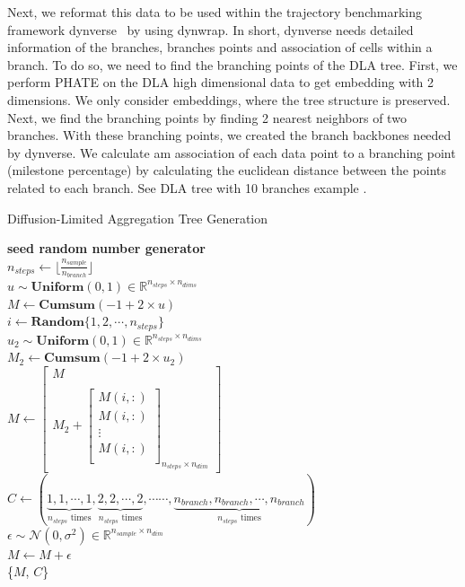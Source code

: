 Next, we reformat this data to be used within the trajectory benchmarking framework dynverse~\citep{saelens2019comparison} by using dynwrap. In short, dynverse needs detailed information of the branches, branches points and association of cells within a branch.  To do so, we need to find the branching points of the DLA tree. First, we perform PHATE on the DLA high dimensional data to get embedding with 2 dimensions. We only consider embeddings, where the tree structure is preserved. Next, we find the branching points by finding 2 nearest neighbors of two branches. With these branching points, we created the branch backbones needed by dynverse. We calculate am association of each data point to a branching point (milestone percentage) by calculating the euclidean distance between the points related to each branch. See DLA tree with 10 branches example .
\begin{algorithm}
\caption{Diffusion-Limited Aggregation Tree Generation}
\label{alg:DLA}
    \textbf{seed random number generator}\\
    $n_{steps} \gets \lfloor\frac{n_{sample}}{n_{branch}}\rfloor$\\
    $u \sim \textbf{Uniform}(0,1)\in\mathbb{R}^{n_{steps} \times n_{dims}}$\\
    $M \gets \textbf{Cumsum}(-1 + 2 \times u)$\\
    {
         $i \gets \textbf{Random}\{1,2,\cdots, n_{steps}\}$\\
         $u_2 \sim \textbf{Uniform}(0,1)\in\mathbb{R}^{n_{steps} \times n_{dims}}$\\
         $M_2 \gets \textbf{Cumsum}(-1 + 2 \times u_2)$\\
        $M \gets \begin{bmatrix}M \\\\
            M_2 +\left[\begin{array}{c} 
                M(i, :)\\
                M(i, :)\\
                \vdots\\
                M(i, :)\\
        \end{array}\right]_{n_{steps}\times n_{dim}} \end{bmatrix}$\\
    }
    $C \gets (\underbrace{1,1,\cdots, 1}_{n_{steps} \text{ times}}, \underbrace{2,2,\cdots, 2}_{n_{steps} \text{ times}},  \cdots\cdots, \underbrace{n_{branch},n_{branch},\cdots, n_{branch}}_{n_{steps} \text{ times}})$\\
    $\epsilon \sim \mathcal{N}(0, \sigma^2)\in\mathbb{R}^{n_{sample}\times n_{dim}}$\\
    $M \gets M + \epsilon$\\
    \Return \{$M$, $C$\}\\
\end{algorithm}

